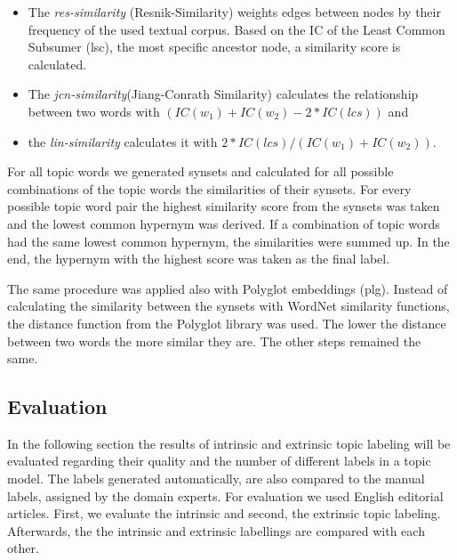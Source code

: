 {\begin{itemize}
\item The \textit{res-similarity} (Resnik-Similarity) weights edges between nodes by their frequency of the used textual corpus. Based on the \ac{IC} of the Least Common Subsumer (lsc), the most specific ancestor node, a similarity score is calculated.
\item The \textit{jcn-similarity}(Jiang-Conrath Similarity) calculates the relationship between two words with $(IC(w_{1}) + IC(w_{2}) - 2 * IC(lcs))$ and \item the \textit{lin-similarity} calculates it with $2 * IC(lcs) / (IC(w_{1}) + IC(w_{2}))$.
\end{itemize}

For all topic words we generated synsets and calculated for all possible combinations of the topic words the similarities of their synsets. For every possible topic word pair the highest similarity score from the synsets was taken and the lowest common hypernym was derived. If a combination of topic words had the same lowest common hypernym, the similarities were summed up. In the end, the hypernym with the highest score was taken as the final label. 

The same procedure was applied also with Polyglot embeddings (plg). Instead of calculating the similarity between the synsets with WordNet similarity functions, the distance function from the Polyglot library was used. The lower the distance between two words the more similar they are. The other steps remained the same.

\subsection{Evaluation}
In the following section the results of intrinsic and extrinsic topic labeling will be evaluated regarding their quality and the number of different labels in a topic model. The labels generated automatically, are also compared to the manual labels, assigned by the domain experts. For evaluation we used English editorial articles.%
First, we evaluate the intrinsic and second, the extrinsic topic labeling. Afterwards, the the intrinsic and extrinsic labellings are compared with each other. 

}
